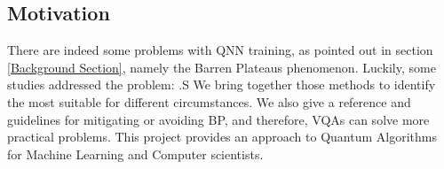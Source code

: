 \subsection{Motivation}
There are indeed some problems with QNN training, as pointed out in section \ref{Background Section}, namely the Barren Plateaus phenomenon.
Luckily, some studies addressed the problem: \cite{pesahAbsenceBarrenPlateaus2021,pattiEntanglementDevisedBarren2021,liuParameterInitializationMethod2021}.S
We bring together those methods to identify the most suitable for different circumstances.
We also give a reference and guidelines for mitigating or avoiding BP, and therefore, VQAs can solve more practical problems. 
This project provides an approach to Quantum Algorithms for Machine Learning and Computer scientists.